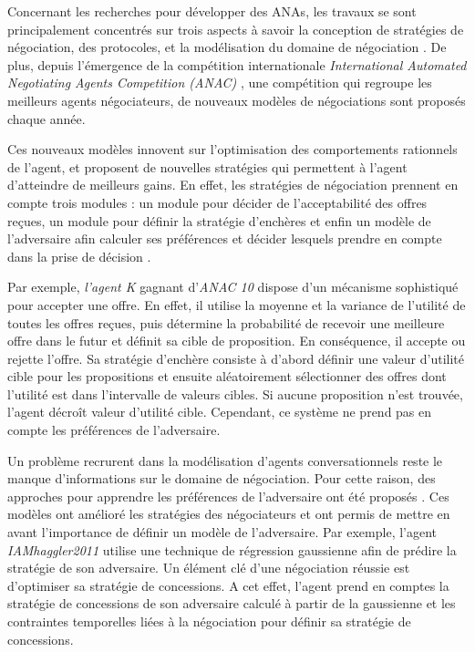 	Concernant les recherches pour développer des ANAs, les travaux se sont principalement concentrés sur trois aspects à savoir la conception de stratégies de négociation, des protocoles, et la modélisation du domaine de négociation \cite{jonker2012negotiating}. De plus, depuis l'émergence de la compétition internationale \emph{International Automated Negotiating Agents Competition (ANAC)} \cite{baarslag2012first,fujita2013second}, une compétition qui regroupe les meilleurs agents négociateurs, de nouveaux modèles de négociations sont proposés chaque année. 
	
	Ces nouveaux modèles innovent sur l'optimisation des comportements rationnels de l'agent, et proposent de nouvelles stratégies qui permettent à l'agent d'atteindre de meilleurs gains. 
	En effet, les stratégies de négociation prennent en compte trois modules : un module pour décider de l'acceptabilité des offres reçues, un module pour définir la stratégie d'enchères et enfin un modèle de l'adversaire afin calculer ses préférences et décider lesquels prendre en compte dans la prise de décision \cite{baarslag2014decoupling}.
	
	Par exemple, \textit{l'agent K} \cite{kawaguchi2011compromising} gagnant d'\emph{ANAC 10} dispose d'un mécanisme sophistiqué pour accepter une offre. En effet, il utilise la moyenne et la variance de l'utilité de toutes les offres reçues, puis détermine la probabilité de recevoir une meilleure offre dans le futur et définit sa cible de proposition. En conséquence, il accepte ou rejette l'offre. Sa stratégie d'enchère consiste à d'abord définir une valeur d'utilité cible pour les propositions et ensuite aléatoirement sélectionner des offres dont l'utilité est dans l'intervalle de valeurs cibles. Si aucune proposition n'est trouvée, l'agent décroît valeur d'utilité cible.	Cependant, ce système ne prend pas en compte les préférences de l'adversaire. 
	
	Un problème recrurent dans la modélisation d'agents conversationnels reste le manque d'informations sur le domaine de négociation. Pour cette raison, des approches pour apprendre les préférences de l'adversaire ont été proposés  \cite{williams2011using,jonker2012negotiating,frieder2013value,hindriks2008creating,hindriks2008opponent}. Ces modèles ont amélioré les stratégies des négociateurs et ont permis de mettre en avant l'importance de définir un modèle de l'adversaire. Par exemple, l'agent \textit{IAMhaggler2011} \cite{williams2011using} utilise une technique de régression gaussienne afin de prédire la stratégie de son adversaire. Un élément clé d'une négociation réussie est d'optimiser sa stratégie de concessions. A cet effet, l'agent prend en comptes la stratégie de concessions de son adversaire calculé à partir de la gaussienne et les contraintes temporelles liées à la négociation pour définir sa stratégie de concessions. 
	
